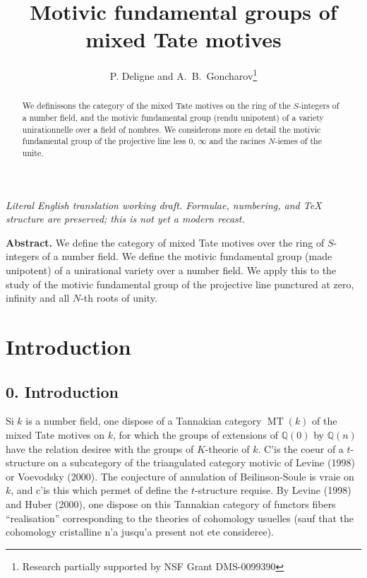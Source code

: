 \documentclass[11pt,a4paper]{article}
\theoremstyle{plain}
\theoremstyle{definition}
\theoremstyle{remark}
\DeclareMathOperator{\MT}{MT}
\newcommand{\dbQ}{\mathbb{Q}}
\begin{document}
\begin{center}\small\emph{Literal English translation working draft. Formulae, numbering, and TeX structure are preserved; this is not yet a modern recast.}\end{center}
\vspace{0.5em}


\title{Motivic fundamental groups of mixed Tate motives}
\author{P. Deligne and A.~B.~Goncharov\thanks{Research partially supported by NSF Grant DMS-0099390}}
\date{}
\maketitle

\begin{abstract}
\noindent
We definissons the category of the mixed Tate motives on the ring of the $S$-integers of a number field, and the motivic fundamental group (rendu unipotent) of a variety unirationnelle over a field of nombres. We considerons more en detail the motivic fundamental group of the projective line less $0$, $\infty$ and the racines $N$-iemes of the unite.
\end{abstract}

\bigskip
\noindent\textbf{Abstract.} We define the category of mixed Tate motives over the ring of $S$-integers of a number field. We define the motivic fundamental group (made unipotent) of a unirational variety over a number field. We apply this to the study of the motivic fundamental group of the projective line punctured at zero, infinity and all $N$-th roots of unity.

\tableofcontents

\section*{Introduction}


\clearpage


\subsection*{0. Introduction}


Si $k$ is a number field, one dispose
of a Tannakian category $\MT(k)$
of the mixed Tate motives on $k$, for which
the groups of extensions of $\dbQ(0)$
by $\dbQ(n)$ have the relation desiree with
the groups of $K$-theorie of $k$.
C'is the coeur of a $t$-structure on a
subcategory of the triangulated category motivic of Levine (1998) or
Voevodsky (2000). 
The conjecture of annulation of
Beilinson-Soule is vraie on $k$, and c'is
this which permet of define the $t$-structure
requise.
By Levine (1998) and Huber (2000), one
dispose on this Tannakian category of
functors fibers ``realisation''
corresponding to the theories of cohomology
usuelles (sauf that the cohomology cristalline
n'a jusqu'a present not ete
consideree).
\end{document}
